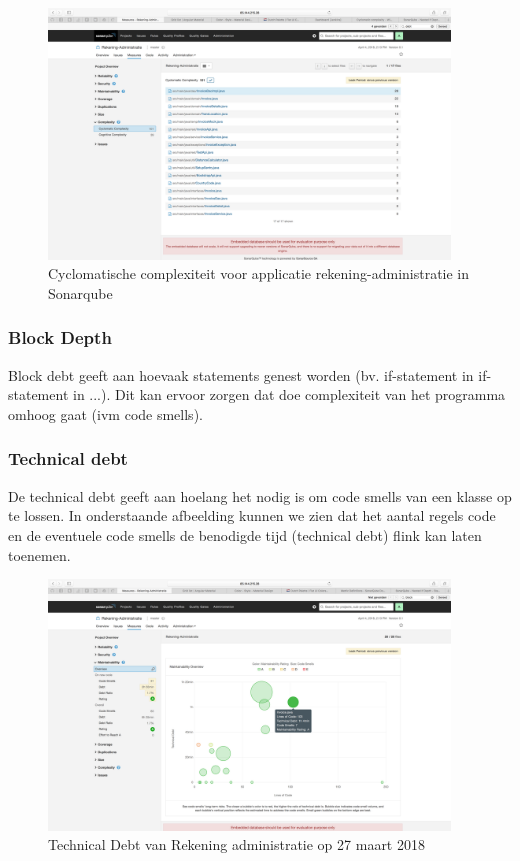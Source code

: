 \begin{figure}[H]
	\centering
	\includegraphics[width=0.95\textwidth]{img/CyclomaticComplexity.png}
	\caption{Cyclomatische complexiteit voor applicatie rekening-administratie in Sonarqube}
	\label{fig:CyclomaticComplexity}
\end{figure}

\subsubsection{Block Depth}
Block debt geeft aan hoevaak statements genest worden (bv. if-statement in if-statement in ...). Dit kan ervoor zorgen dat doe complexiteit van het programma omhoog gaat (ivm code smells).
\subsubsection{Technical debt}
De technical debt geeft aan hoelang het nodig is om code smells van een klasse op te lossen. In onderstaande afbeelding kunnen we zien dat het aantal regels code en de eventuele code smells de benodigde tijd (technical debt) flink kan laten toenemen.

\begin{figure}[H]
	\centering
	\includegraphics[width=0.95\textwidth]{img/TechnicalDebt.png}
	\caption{Technical Debt van Rekening administratie op 27 maart 2018}
	\label{fig:TechnicalDebt}
\end{figure}

